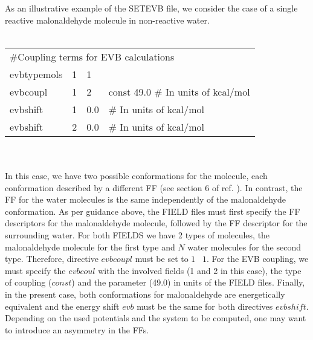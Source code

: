 As an illustrative example of the SETEVB file, we consider the case of a single reactive malonaldehyde molecule in non-reactive water.\\
\\
\begin{tabular}{ l l l l}
\multicolumn{4}{l}{\#Coupling terms for EVB calculations} \\
evbtypemols  &   1    &   1  &\\

evbcoupl     &   1   &    2  &     const 49.0 \# In units of kcal/mol\\
evbshift     &   1   &    0.0  & \# In units of kcal/mol\\
evbshift     &   2   &    0.0  &\# In units of kcal/mol\\
\end{tabular}\\
\\
 In this case, we have two possible conformations for the molecule, each conformation described by a different FF (see section 6 of ref. \cite{scivetti-evb}). In contrast, the FF for the water molecules is the same independently of the malonaldehyde conformation. As per guidance above, the FIELD files must first specify the FF descriptors for the malonaldehyde molecule, followed by the FF descriptor for the surrounding water. For both FIELDS we have 2 types of molecules, the malonaldehyde molecule for the first type and $N$ water molecules for the second type. Therefore, directive $evbcoupl$ must be set to $1\,\,\,\,\, 1$. For the EVB coupling, we must specify the $evbcoul$ with the involved fields (1 and 2 in this case), the type of coupling ($const$) and the parameter (49.0) in units of the FIELD files. Finally, in the present case, both conformations for malonaldehyde are energetically equivalent and the energy shift $evb$ must be the same for both directives $evbshift$. Depending on the used potentials and the system to be computed, one may want to introduce an asymmetry in the FFs. 